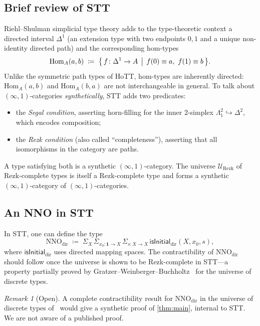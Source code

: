 \documentclass[12pt]{article}
\theoremstyle{definition}
\theoremstyle{remark}
\newtheorem{remark}[theorem]{Remark}
\newcommand{\Hom}{\mathrm{Hom}}
\newcommand{\NNO}{\mathrm{NNO}}
\newcommand{\U}{\mathcal{U}}
\newcommand{\Sigmatype}{\Sigma}
\begin{document}
\subsection{Brief review of STT}

Riehl--Shulman simplicial type theory adds to the type-theoretic context a directed interval $\Delta^{1}$ (an extension type with two endpoints $0,1$ and a unique non-identity directed path) and the corresponding hom-types
\[
\Hom_{A}(a,b) \;\coloneqq\; \bigl\{\,f\colon \Delta^{1}\to A \,\bigm|\, f(0)\equiv a,\ f(1)\equiv b\,\bigr\}.
\]
Unlike the symmetric path types of HoTT, hom-types are inherently directed: $\Hom_{A}(a,b)$ and $\Hom_{A}(b,a)$ are not interchangeable in general. To talk about $(\infty,1)$-categories \emph{synthetically}, STT adds two predicates:
\begin{itemize}
  \item the \emph{Segal condition}, asserting horn-filling for the inner $2$-simplex $\Lambda^{2}_{1}\hookrightarrow\Delta^{2}$, which encodes composition;
  \item the \emph{Rezk condition} (also called ``completeness''), asserting that all isomorphisms in the category are paths.
\end{itemize}
A type satisfying both is a synthetic $(\infty,1)$-category. The universe $\U_{\mathrm{Rezk}}$ of Rezk-complete types is itself a Rezk-complete type and forms a synthetic $(\infty,1)$-category of $(\infty,1)$-categories.

\subsection{An NNO in STT}

In STT, one can define the type
\[
\NNO_{\mathrm{dir}} \;\coloneqq\; \Sigmatype_{X}\,\Sigmatype_{x_{0}\colon \mathbf{1}\to X}\,\Sigmatype_{s\colon X\to X}\,\mathsf{isInitial}_{\mathrm{dir}}(X,x_{0},s),
\]
where $\mathsf{isInitial}_{\mathrm{dir}}$ uses directed mapping spaces. The contractibility of $\NNO_{\mathrm{dir}}$ should follow once the universe is shown to be Rezk-complete in STT---a property partially proved by Gratzer--Weinberger--Buchholtz~\cite{GWB2024} for the universe of discrete types.

\begin{remark}[Open]
A complete contractibility result for $\NNO_{\mathrm{dir}}$ in the universe of discrete types of~\cite{GWB2024} would give a synthetic proof of \cref{thm:main}, internal to STT\@. We are not aware of a published proof.
\end{remark}
\end{document}
